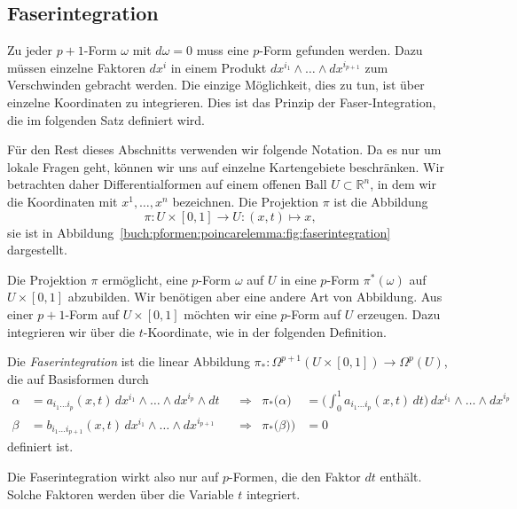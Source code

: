 %
%
\subsection{Faserintegration
\label{buch:pformen:poincare:subsection:faserintegration}}
%
Zu jeder $p+1$-Form $\omega$ mit $d\omega=0$ muss eine $p$-Form gefunden
werden.
Dazu müssen einzelne Faktoren $dx^i$ in einem Produkt
$dx^{i_1}\wedge\dots\wedge dx^{i_{p+1}}$ zum Verschwinden gebracht
werden.
Die einzige Möglichkeit, dies zu tun, ist über einzelne Koordinaten zu
integrieren.
Dies ist das Prinzip der Faser-Integration, die im folgenden Satz
definiert wird.

Für den Rest dieses Abschnitts verwenden wir folgende Notation.
Da es nur um lokale Fragen geht, können wir uns auf einzelne
Kartengebiete beschränken.
Wir betrachten daher Differentialformen auf einem offenen Ball
$U\subset\mathbb{R}^n$, in dem wir die Koordinaten mit $x^1,\dots,x^n$
bezeichnen.
Die Projektion $\pi$ ist die Abbildung
\[
\pi
\colon U \times [0,1]\to U : (x,t) \mapsto x,
\]
sie ist in Abbildung~\ref{buch:pformen:poincarelemma:fig:faserintegration}
dargestellt.

Die Projektion $\pi$ ermöglicht, eine $p$-Form $\omega$ auf $U$ in eine
$p$-Form $\pi^*(\omega)$ auf $U\times [0,1]$ abzubilden.
Wir benötigen aber eine andere Art von Abbildung.
Aus einer $p+1$-Form auf $U\times[0,1]$ möchten wir eine $p$-Form auf
$U$ erzeugen.
Dazu integrieren wir über die $t$-Koordinate, wie in der folgenden
Definition.

\begin{definition}
Die {\em Faserintegration} ist die linear Abbildung
%
$\pi_*\colon \Omega^{p+1}(U\times[0,1])\to\Omega^p(U)$,
die auf Basisformen durch
\begin{align*}
\alpha
&=
a_{i_1 \dots i_p}(x,t)
\,
dx^{i_1}\wedge\dots\wedge dx^{i_p}\wedge dt
&&\Rightarrow&
\pi_*\bigl(
\alpha
\bigr)
&=
\biggl(
\int_0^1 a_{i_1 \dots i_p}(x,t)\,dt
\biggr)
\,
dx^{i_1}\wedge\dots\wedge dx^{i_p}
\\
\beta
&=
b_{i_1 \dots i_{p+1}}(x,t)
\,
dx^{i_1}\wedge \dots \wedge dx^{i_{p+1}}
&&\Rightarrow&
\pi_*\bigl(\beta)
\bigr)
&=
0
\end{align*}
definiert ist.
\end{definition}

Die Faserintegration wirkt also nur auf $p$-Formen, die den Faktor $dt$
enthält.
Solche Faktoren werden über die Variable $t$ integriert.

